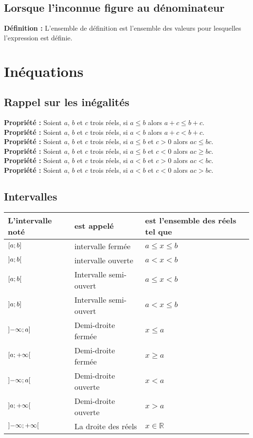 \documentclass[a4paper,titlepage]{article}
\let\oldsection\section
\renewcommand\section{\clearpage\oldsection}
\let\oldleft\left
\renewcommand{\left}{\mathopen{}\mathclose\bgroup\oldleft}
\let\oldright\right
\renewcommand{\right}{\aftergroup\egroup\oldright}
\begin{document}
    \subsection{Lorsque l’inconnue figure au dénominateur}
        \textbf{Définition :} L’ensemble de définition est l’ensemble des valeurs pour lesquelles l’expression est définie.
\section{Inéquations}
    \subsection{Rappel sur les inégalités}
        \textbf{Propriété :} Soient $a$, $b$ et $c$ trois réels, si $a\leqslant b$ alors $a+c\leqslant b+c$.
        \\
        \textbf{Propriété :} Soient $a$, $b$ et $c$ trois réels, si $a<b$ alors $a+c<b+c$.
        \\
        \textbf{Propriété :} Soient $a$, $b$ et $c$ trois réels, si $a\leqslant b$ et $c>0$ alors $ac\leqslant bc$.
        \\
        \textbf{Propriété :} Soient $a$, $b$ et $c$ trois réels, si $a\leqslant b$ et $c<0$ alors $ac\geqslant bc$.
        \\
        \textbf{Propriété :} Soient $a$, $b$ et $c$ trois réels, si $a<b$ et $c>0$ alors $ac<bc$.
        \\
        \textbf{Propriété :} Soient $a$, $b$ et $c$ trois réels, si $a<b$ et $c<0$ alors $ac>bc$.
    \subsection{Intervalles}
        \begin{tabularx}{\linewidth}{|Y|Y|Y|}
            \hline
            {\textbf{L’intervalle noté}} & \textbf{est appelé} & \textbf{est l’ensemble des réels tel que} \\
            \hline
            $\left[a;b\right]$ & intervalle fermée & $a\leqslant x\leqslant b$ \\
            \hline
            $\left]a;b\right[$ & intervalle ouverte & $a<x<b$ \\
            \hline
            $\left[a;b\right[$ & Intervalle semi-ouvert & $a\leqslant x<b$ \\
            \hline
            $\left]a;b\right]$ & Intervalle semi-ouvert & $a<x\leqslant b$ \\
            \hline
            $\left]-\infty;a\right]$ & Demi-droite fermée & $x\leqslant a$ \\
            \hline
            $\left[a;+\infty\right[$ & Demi-droite fermée & $x\geqslant a$ \\
            \hline
            $\left]-\infty;a\right[$ & Demi-droite ouverte & $x<a$ \\
            \hline
            $\left]a;+\infty\right[$ & Demi-droite ouverte & $x>a$ \\
            \hline
            $\left]-\infty;+\infty\right[$ & La droite des réels & $x\in\mathbb{R}$ \\
            \hline
        \end{tabularx}
\end{document}

